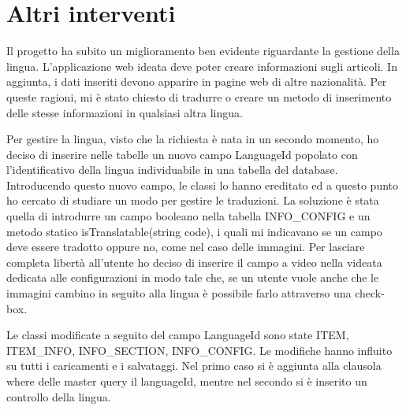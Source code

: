 \section{Altri interventi}\label{altriInterveti}
Il progetto ha subito un miglioramento ben evidente riguardante la gestione della lingua. L'applicazione web ideata deve poter creare informazioni sugli  articoli. In aggiunta, i dati inseriti devono apparire in pagine web di altre nazionalità. Per queste ragioni, mi è stato chiesto di tradurre o creare un metodo di inserimento delle stesse informazioni in qualsiasi altra lingua.

Per gestire la lingua, visto che la richiesta è nata in un secondo momento, ho deciso di inserire nelle tabelle un nuovo campo LanguageId popolato con l'identificativo della lingua individuabile in una tabella del database.
Introducendo questo nuovo campo, le classi lo hanno ereditato ed a questo punto ho cercato di studiare un modo per gestire le traduzioni. La soluzione è stata quella di introdurre un campo booleano nella tabella INFO\_CONFIG e un metodo statico isTranslatable(string code), i quali mi indicavano se un campo deve essere tradotto oppure no, come nel caso delle immagini.
Per lasciare completa libertà all'utente ho deciso di inserire il campo a video nella videata dedicata alle configurazioni in modo tale che, se un utente vuole anche che le immagini cambino in seguito alla lingua è possibile farlo attraverso una check-box.

Le classi modificate a seguito del campo LanguageId sono state ITEM, ITEM\_INFO, INFO\_SECTION, INFO\_CONFIG. Le modifiche hanno influito su tutti i caricamenti e i salvataggi. Nel primo caso si è aggiunta alla clausola where delle master query il languageId, mentre nel secondo si è inserito un controllo della lingua.
